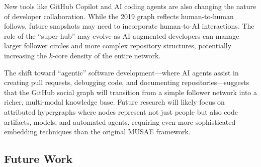 \documentclass[letterpaper]{article}
\begin{document}
New tools like GitHub Copilot and AI coding agents are also changing the nature of developer collaboration. While the 2019 graph reflects human-to-human follows, future snapshots may need to incorporate human-to-AI interactions. The role of the ``super-hub'' may evolve as AI-augmented developers can manage larger follower circles and more complex repository structures, potentially increasing the $k$-core density of the entire network.

The shift toward ``agentic'' software development---where AI agents assist in creating pull requests, debugging code, and documenting repositories---suggests that the GitHub social graph will transition from a simple follower network into a richer, multi-modal knowledge base. Future research will likely focus on attributed hypergraphs where nodes represent not just people but also code artifacts, models, and automated agents, requiring even more sophisticated embedding techniques than the original MUSAE framework.

\subsection{Future Work}
\end{document}
